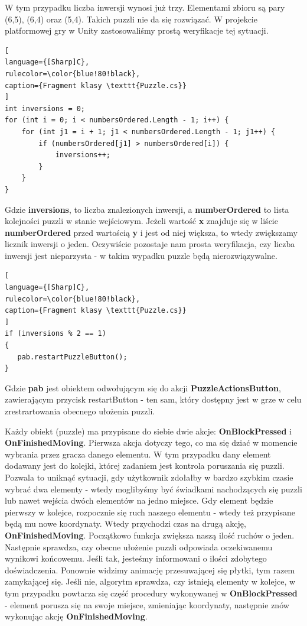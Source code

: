 \documentclass[oneside,polski,logo]{amuthesis}
\begin{document}
W tym przypadku liczba inwersji wynosi już trzy. Elementami zbioru są pary (6,5), (6,4) oraz (5,4). Takich puzzli nie da się rozwiązać. 
W projekcie platformowej gry w Unity zastosowaliśmy prostą weryfikacje tej sytuacji. 
\\
\begin{lstlisting}[
language={[Sharp]C},
rulecolor=\color{blue!80!black},
caption={Fragment klasy \texttt{Puzzle.cs}}
]
int inversions = 0;
for (int i = 0; i < numbersOrdered.Length - 1; i++) {
    for (int j1 = i + 1; j1 < numbersOrdered.Length - 1; j1++) {
        if (numbersOrdered[j1] > numbersOrdered[i]) {
            inversions++;
        }
    }
}

\end{lstlisting}
\par Gdzie \textbf{inversions}, to liczba znalezionych inwersji, a \textbf{numberOrdered} to lista kolejności puzzli w stanie wejściowym. Jeżeli wartość \textbf{x} znajduje się w liście \textbf{numberOrdered} przed wartością \textbf{y} i jest od niej większa, to wtedy zwiększamy licznik inwersji o jeden.
Oczywiście pozostaje nam prosta weryfikacja, czy liczba inwersji jest nieparzysta - w takim wypadku puzzle będą nierozwiązywalne.
\begin{lstlisting}[
language={[Sharp]C},
rulecolor=\color{blue!80!black},
caption={Fragment klasy \texttt{Puzzle.cs}}
]
if (inversions % 2 == 1)
{
   pab.restartPuzzleButton();
}
\end{lstlisting}

Gdzie \textbf{pab} jest obiektem odwołującym się do akcji \textbf{PuzzleActionsButton}, zawierającym przycisk restartButton - ten sam, który dostępny jest w grze w celu zrestrartowania obecnego ułożenia puzzli.

Każdy obiekt (puzzle) ma przypisane do siebie dwie akcje: \textbf{OnBlockPressed} i \textbf{OnFinishedMoving}. Pierwsza akcja dotyczy tego, co ma się dziać w momencie wybrania przez gracza danego elementu. W tym przypadku dany element dodawany jest do kolejki, której zadaniem jest kontrola poruszania się puzzli. Pozwala to uniknąć sytuacji, gdy użytkownik zdołałby w bardzo szybkim czasie wybrać dwa elementy - wtedy moglibyśmy być świadkami nachodzących się puzzli lub nawet wejścia dwóch elementów na jedno miejsce. Gdy element będzie pierwszy w kolejce, rozpocznie się ruch naszego elementu - wtedy też przypisane będą mu nowe koordynaty. Wtedy przychodzi czas na drugą akcję, \textbf{OnFinishedMoving}. Początkowo funkcja zwiększa naszą ilość ruchów o jeden. Następnie sprawdza, czy obecne ułożenie puzzli odpowiada oczekiwanemu wynikowi końcowemu. Jeśli tak, jesteśmy informowani o ilości zdobytego doświadczenia. Ponownie widzimy animację przesuwającej się płytki, tym razem zamykającej się. Jeśli nie, algorytm sprawdza, czy istnieją elementy w kolejce, w tym przypadku powtarza się część procedury wykonywanej w \textbf{OnBlockPressed} - element porusza się na swoje miejsce, zmieniając koordynaty, następnie znów wykonując akcję \textbf{OnFinishedMoving}.
\end{document}

